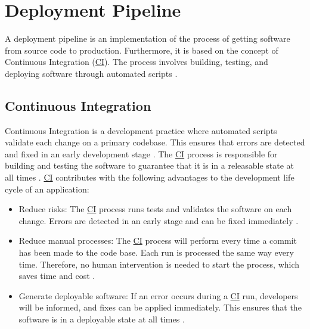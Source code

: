 \section{Deployment Pipeline}
\label{sec:02_depl-pipeline}
A deployment pipeline is an implementation of the process of getting software from source code to production.
Furthermore, it is based on the concept of Continuous Integration (\hyperlink{abbr:ci}{CI}).
The process involves building, testing, and deploying software through automated scripts \cite{Farley2010CI}.


\subsection{Continuous Integration}
Continuous Integration is a development practice where automated scripts validate each change on a primary codebase. This ensures that errors are detected and fixed in an early development stage \cite{Duvall2007CI}.
The \hyperlink{abbr:ci}{CI} process is responsible for building and testing the software to guarantee that it is in a releasable state at all times \cite{Rossel2017CICD}.
\hyperlink{abbr:ci}{CI} contributes with the following advantages to the development life cycle of an application:
\begin{itemize}
\item Reduce risks:
The \hyperlink{abbr:ci}{CI} process runs tests and validates the software on each change. Errors are detected in an early stage and can be fixed immediately \cite{Duvall2007CI}.

\item Reduce manual processes:
The \hyperlink{abbr:ci}{CI} process will perform every time a commit has been made to the code base.
Each run is processed the same way every time.
Therefore, no human intervention is needed to start the process, which saves time and cost \cite{Duvall2007CI}.

\item Generate deployable software:
If an error occurs during a \hyperlink{abbr:ci}{CI} run, developers will be informed, and fixes can be applied immediately.
This ensures that the software is in a deployable state at all times \cite{Duvall2007CI}.
\end{itemize}


